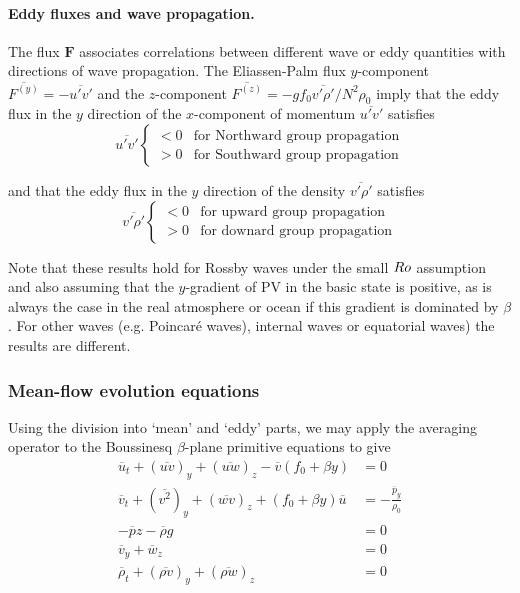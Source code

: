 \documentclass{jknotes}
\begin{document}
\paragraph{Eddy fluxes and wave propagation.} The flux $\symbf{F}$ associates
correlations between different wave or eddy quantities with directions of wave
propagation. The Eliassen-Palm flux $y$-component $\overline{F^{(y)}} =
-\overline{u'v'}$ and the $z$-component $\overline{F^{(z)}} = -g f_0
\overline{v'\rho'}/N^2 \rho_0$ imply that the eddy flux in the $y$ direction
of the $x$-component of momentum $\overline{u'v'}$ satisfies
\begin{equation}
	\overline{u'v'} \begin{cases} < 0 & \text{for Northward group propagation}
		\\ > 0 & \text{for Southward group propagation}\end{cases}
\end{equation}

and that the eddy flux in the $y$ direction of the density
$\overline{v'\rho'}$ satisfies
\begin{equation}
	\overline{v'\rho'} \begin{cases}
		< 0 & \text{for upward group propagation} \\
		> 0 & \text{for downard group propagation}
	\end{cases}
\end{equation}

Note that these results hold for Rossby waves under the small $Ro$ assumption
and also assuming that the $y$-gradient of PV in the basic state is positive,
as is always the case in the real atmosphere or ocean if this gradient is
dominated by $\beta$. For other waves (e.g. Poincar\'{e} waves), internal
waves or equatorial waves) the results are different.

\subsubsection{Mean-flow evolution equations}
Using the division into `mean' and `eddy' parts, we may apply the averaging
operator to the Boussinesq $\beta$-plane primitive equations to give
\begin{align}
	\overline{u}_t + (\overline{uv})_y + (\overline{uw})_z
	-\overline{v}(f_0+\beta y) &= 0 \\
	\overline{v}_t + (\overline{v^2})_y + (\overline{wv})_z + (f_0 + \beta y)
	\overline{u} &= -\frac{\overline{p}_y}{\rho_0} \\
	-\overline{p}z - \overline{\rho} g &= 0 \\
	\overline{v}_y + \overline{w}_z &= 0 \label{eq:13.6}\\
	\overline{\rho}_t + (\overline{\rho v})_y + (\overline{\rho w})_z &= 0
\end{align}
\end{document}
